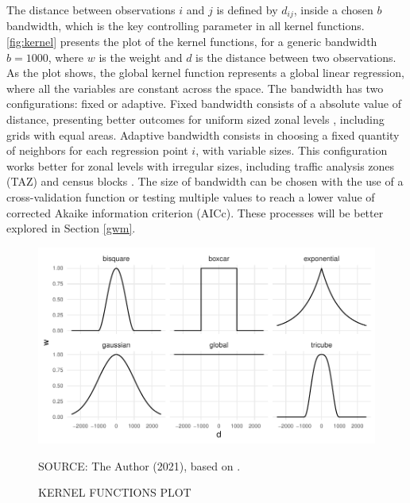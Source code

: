 The distance between observations $i$ and $j$ is defined by $d_{ij}$, inside a chosen $b$ bandwidth, which is the key controlling parameter in all kernel functions. \autoref{fig:kernel} presents the plot of the kernel functions, for a generic bandwidth $b = 1000$, where $w$ is the weight and $d$ is the distance between two observations. As the plot shows, the global kernel function represents a global linear regression, where all the variables are constant across the space. The bandwidth has two configurations: fixed or adaptive. Fixed bandwidth consists of a absolute value of distance, presenting better outcomes for uniform sized zonal levels \cite{Huang2018}, including grids with equal areas. Adaptive bandwidth consists in choosing a fixed quantity of neighbors for each regression point $i$, with variable sizes. This configuration works better for zonal levels with irregular sizes, including traffic analysis zones (TAZ) and census blocks \cite{Yu2017}. The size of bandwidth can be chosen with the use of a cross-validation function or testing multiple values to reach a lower value of corrected Akaike information criterion (AICc). These processes will be better explored in Section \ref{gwm}.

\begin{figure}[!htbp]
    \centering\footnotesize
    \captionsetup{font=footnotesize}
    \caption{KERNEL FUNCTIONS PLOT}
    \includegraphics{fig/kernel.pdf}
    \label{fig:kernel}
    \par SOURCE: The Author (2021), based on \textcite{Gollini2013}.
\end{figure}

